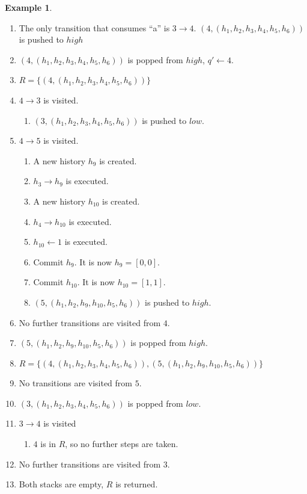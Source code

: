 \documentclass[english]{sigplanconf}
\theoremstyle{definition}
\newtheorem{example}{Example}[section]
\begin{document}
\begin{example}
\begin{enumerate}
\item The only transition that consumes ``a'' is $3\rightarrow 4$. $(4, (h_1, h_2, h_3, h_4, h_5, h_6))$ is pushed to $high$
\item $(4, (h_1, h_2, h_3, h_4, h_5, h_6))$ is popped from $high$, $q'\leftarrow 4$.
\item $R=\{(4, (h_1, h_2, h_3, h_4, h_5, h_6))\}$
\item $4\rightarrow 3$ is visited. \begin{enumerate}
	\item $(3, (h_1, h_2, h_3, h_4, h_5, h_6))$ is pushed to $low$.
\end{enumerate}
\item $4\rightarrow 5$ is visited. \begin{enumerate}
	\item A new history $h_9$ is created.
	\item $h_3\rightarrow h_9$ is executed.
	\item A new history $h_{10}$ is created.
	\item $h_4\rightarrow h_{10}$ is executed.
	\item $h_{10} \leftarrow 1$ is executed.
	\item Commit $h_9$. It is now $h_9=[0,0]$.
	\item Commit $h_{10}$. It is now $h_{10}=[1,1]$.
	\item $(5, (h_1, h_2, h_9, h_{10}, h_5, h_6))$ is pushed to $high$.
\end{enumerate}
\item No further transitions are visited from $4$.
\item $(5, (h_1, h_2, h_9, h_{10}, h_5, h_6))$ is popped from $high$.
\item $R=\{(4, (h_1, h_2, h_3, h_4, h_5, h_6)), (5, (h_1, h_2, h_9, h_{10}, h_5, h_6))\}$
\item No transitions are visited from $5$.
\item $(3, (h_1, h_2, h_3, h_4, h_5, h_6))$ is popped from $low$.
\item $3\rightarrow 4$ is visited \begin{enumerate}
	\item $4$ is in $R$, so no further steps are taken.
\end{enumerate}
\item No further transitions are visited from $3$.
\item Both stacks are empty, $R$ is returned.
\end{enumerate}
\end{example}
\end{document}
